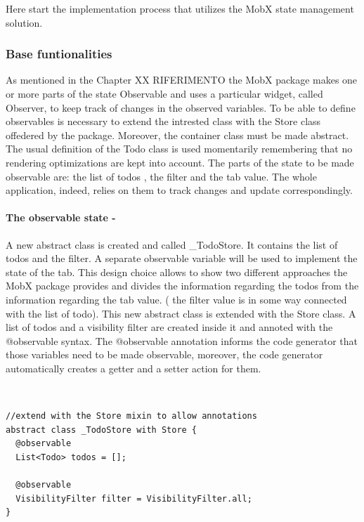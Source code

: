 Here start the implementation process that utilizes the MobX state management solution.

\subsubsection{Base funtionalities}  \label{par:todo_app_inherited_widget_introduction} 
 
As mentioned in the Chapter XX RIFERIMENTO the MobX package makes one or more parts of the state Observable and uses a particular widget, called Observer, to keep track of changes in the observed variables. To be able to define observables is necessary to extend the intrested class with the Store class offedered by the package. Moreover, the container class must be made abstract. The usual definition of the Todo class is used momentarily remembering that no rendering optimizations are kept into account. The parts of the state to be made observable are: the list of todos , the filter and the tab value. The whole application, indeed, relies on them to track changes and update correspondingly. 
\paragraph{The observable state - }
\label{subpar:todo_app_bloc_core_state}A new abstract class is created and called \_TodoStore. It contains the list of todos and the filter. A separate observable variable will be used to implement the state of the tab. This design choice allows to show two different approaches the MobX package provides and divides the information regarding the todos from the information regarding the tab value. ( the filter value is in some way connected with the list of todo). This new abstract class is extended with the Store class. A list of todos and a visibility filter are created inside it and annoted with the @observable syntax. The @observable annotation informs the code generator that those variables need to be made observable, moreover, the code generator automatically creates a getter and a setter action for them. 
\begin{code}
\mbox{}\\
 \mbox{}
		\label{code:2.14}
\begin{verbatim}
//extend with the Store mixin to allow annotations
abstract class _TodoStore with Store {
  @observable
  List<Todo> todos = [];

  @observable
  VisibilityFilter filter = VisibilityFilter.all;
}
\end{verbatim}
\mbox{}
\end{code}

